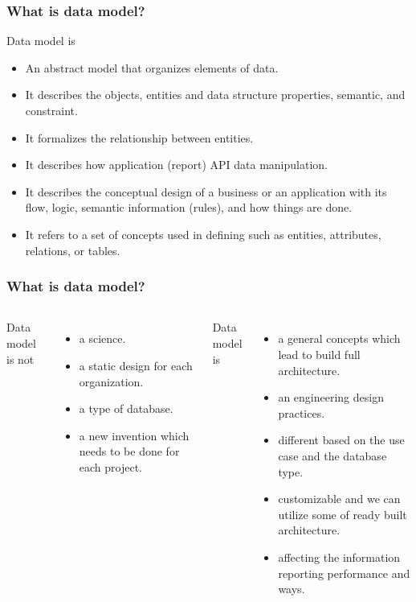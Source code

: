 
\begin{frame}
\frametitle{What is data model?}
Data model is
\begin{itemize}[<+->]
	\item An abstract model that organizes elements of data.
	\item It describes the objects, entities and data structure properties, semantic, and constraint.
	\item It formalizes the relationship between entities.
	\item It describes how application (report) API data manipulation.
	\item It describes the conceptual design of a business or an application with its flow, logic, semantic information (rules), and how things are done.
	\item It refers to a set of concepts used in defining such as entities, attributes, relations, or tables.
\end{itemize}
\end{frame}

\begin{frame}
\frametitle{What is data model?}

\begin{columns}

Data model is not	
\begin{itemize}[<+->]
	\item a science.
	\item a static design for each organization.
	\item a type of database.
	\item a new invention which needs to be done for each project. %
\end{itemize}


Data model is		
\begin{itemize}[<+->]
	\item a general concepts which lead to build full architecture.
	\item an engineering design practices.
	\item different based on the use case and the database type.
	\item customizable and we can utilize some of ready built architecture.
	\item affecting the information reporting performance and ways.
\end{itemize}

\end{columns}

\end{frame}

